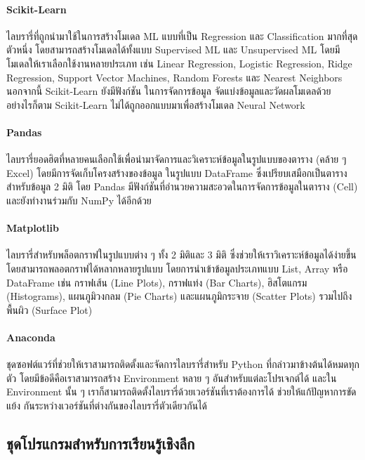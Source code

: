 \paragraph{Scikit-Learn}
ไลบรารี่ที่ถูกนำมาใช้ในการสร้างโมเดล ML แบบที่เป็น Regression และ Classification มากที่สุดตัวหนึ่ง โดยสามารถสร้างโมเดลได้ทั้งแบบ 
Supervised ML และ Unsupervised ML โดยมีโมเดลให้เราเลือกใช้งานหลายประเภท เช่น Linear Regression, Logistic Regression, 
Ridge Regression, Support Vector Machines, Random Forests และ Nearest Neighbors นอกจากนี้ Scikit-Learn ยังมีฟังก์ชัน%
ในการจัดการข้อมูล จัดแบ่งข้อมูลและวัดผลโมเดลด้วย อย่างไรก็ตาม Scikit-Learn ไม่ได้ถูกออกแบบมาเพื่อสร้างโมเดล Neural Network

\paragraph{Pandas}
ไลบรารี่ยอดฮิตที่หลายคนเลือกใช้เพื่อนำมาจัดการและวิเคราะห์ข้อมูลในรูปแบบของตาราง (คล้าย ๆ Excel) โดยมีการจัดเก็บโครงสร้างของข้อมูล%
ในรูปแบบ DataFrame ซึ่งเปรียบเสมือกเป็นตารางสำหรับข้อมูล 2 มิติ โดย Pandas มีฟังก์ชันที่อำนวยความสะอวดในการจัดการข้อมูลในตาราง (Cell) 
และยังทำงานร่วมกับ NumPy ได้อีกด้วย

\paragraph{Matplotlib}
ไลบรารี่สำหรับพล็อตกราฟในรูปแบบต่าง ๆ ทั้ง 2 มิติและ 3 มิติ ซึ่งช่วยให้เราวิเคราะห์ข้อมูลได้ง่ายขึ้น โดยสามารถพลอตกราฟได้หลากหลายรูปแบบ%
โดยการนำเข้าข้อมูลประเภทแบบ List, Array หรือ DataFrame เช่น กราฟเส้น (Line Plots), กราฟแท่ง (Bar Charts), ฮิสโตแกรม 
(Histograms), แผนภูมิวงกลม (Pie Charts) และแผนภูมิกระจาย (Scatter Plots) รวมไปถึงพื้นผิว (Surface Plot)

\paragraph{Anaconda}
ชุดซอฟต์แวร์ที่ช่วยให้เราสามารถติดตั้งและจัดการไลบรารี่สำหรับ Python ที่กล่าวมาข้างต้นได้หมดทุกตัว โดยมีข้อดีคือเราสามารถสร้าง Environment 
หลาย ๆ อันสำหรับแต่ละโปรเจกต์ได้ และใน Environment นั้น ๆ เราก็สามารถติดตั้งไลบรารี่ด้วยเวอร์ชันที่เราต้องการได้ ช่วยให้แก้ปัญหาการขัดแย้ง%
กันระหว่างเวอร์ชันที่ต่างกันของไลบรารี่ตัวเดียวกันได้

\subsection{ชุดโปรแกรมสำหรับการเรียนรู้เชิงลึก}

